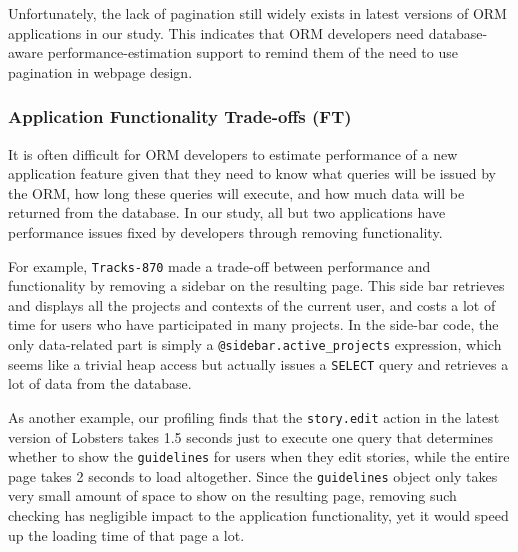 Unfortunately, the lack of pagination still widely exists in latest versions
of ORM applications in our study. This indicates that ORM developers need 
database-aware performance-estimation 
support to remind them of the need to use pagination in webpage design.
\vspace{-0.08in}

\subsubsection{Application Functionality Trade-offs (FT)}
\label{sec:simplifyfeatures}

It is often difficult for ORM developers to estimate performance of a new application feature given that they need to know what queries will be issued by the ORM, how long these queries will execute, and how much data will be returned from the database. In our study, all but two applications have performance issues fixed by developers through removing functionality. 

For example, \texttt{Tracks-870} made a trade-off between performance and functionality by removing a sidebar on the resulting page. This side bar retrieves and displays all the projects and contexts of the current user, and costs a lot of time for users who have participated in many projects.
In the side-bar code, the only data-related part is simply a \texttt{@sidebar.active\_projects} expression, which seems like a trivial
heap access but actually issues a \texttt{SELECT} query and retrieves a lot of data from the database.

As another example, our profiling finds that the \texttt{story.edit} action in the latest version of Lobsters takes 1.5 seconds just to execute one query that determines whether to show the \texttt{guidelines} for users when they edit stories, while the entire page takes 2 seconds to load altogether. Since the  \texttt{guidelines} object only takes very small amount of space to show on the resulting page, removing such checking has negligible impact to the application functionality, yet it would speed up the loading time of that page a lot. 


